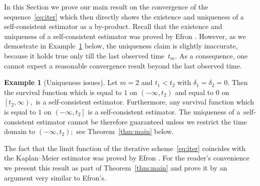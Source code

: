 \documentclass{amsart}
\theoremstyle{plain}
\theoremstyle{definition}
\newtheorem{exa}[thm]{Example}
\def\l{\left}
\def\r{\right}
\begin{document}
In this Section we prove our main result on the convergence of the sequence~\eqref{eq:iter} which then directly shows the existence and uniqueness of a self-consistent estimator as a by-product. Recall that the existence and uniqueness of a self-consistent estimator was proved by Efron \cite[Theorem 7.1]{efron}. However, as we demostrate in Example~\ref{exa:counterex} below, the uniqueness claim is slightly inaccurate, because it holds true only till the last observed time~$t_m.$ As a consequence, one cannot expect a reasonable convergence result beyond the last observed time.
\begin{exa}[Uniqueness issues] \label{exa:counterex}
 Let $m=2$ and $t_1<t_2$ with $\delta_1=\delta_2=0.$ Then the survival function which is equal to $1$ on $\l(-\infty,t_2\r)$ and equal to $0$ on $\l[t_2,\infty\r),$ is a self-consistent estimator. Furthermore, any survival function which is equal to $1$ on $\l(-\infty,t_2\r]$ is a self-consistent estimator. The uniqueness of a~self-consistent estimator cannot be therefore guaranteed unless we restrict the time domain to $\l(-\infty,t_2\r);$ see Theorem~\ref{thm:main} below.
 \end{exa}
 
The fact that the limit function of the iterative scheme~\eqref{eq:iter} coincides with the Kaplan--Meier estimator was proved by Efron \cite[Corollary 7.1]{efron}. For the reader's convenience we present this result as part of Theorem~\ref{thm:main} and prove it by an argument very similar to Efron's.
\end{document}
